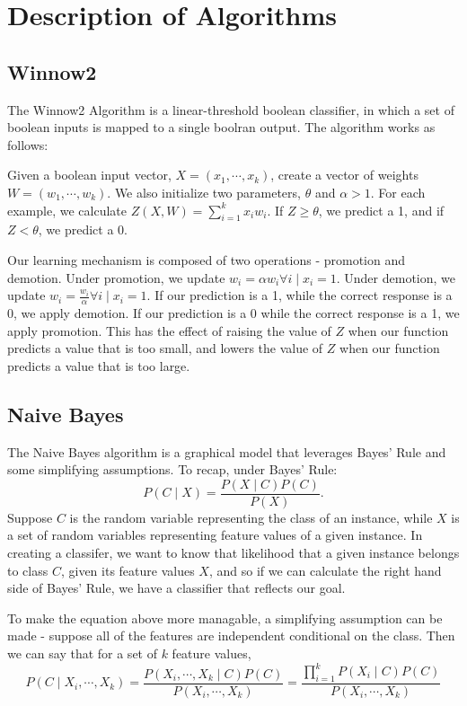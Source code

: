 \documentclass{amsart}
\begin{document}
    \section{Description of Algorithms}
    \subsection*{Winnow2}
    The Winnow2 Algorithm\cite{winnow2} is a linear-threshold boolean classifier, in which a set of boolean inputs is mapped
    to a single boolran output. The algorithm works as follows:

    Given a boolean input vector, $X = (x_1, \cdots, x_k)$,  create a vector of weights $W = (w_1, \cdots, w_k)$.
    We also initialize two parameters, $\theta$ and $\alpha > 1$.
    For each example, we calculate $Z(X, W) = \sum_{i=1}^k x_i w_i$. If $Z \geq \theta$, we
    predict a 1, and if $Z < \theta$, we predict a 0.

    Our learning mechanism is composed of two operations - promotion and demotion.
    Under promotion, we update $w_i = \alpha w_i \forall i \mid x_i = 1$. Under demotion,
    we update $w_i =  \frac{w_i}{\alpha} \forall i \mid x_i = 1$. If our prediction is a 1, while
    the correct response is a 0, we apply demotion. If our prediction is a 0 while the correct
    response is a 1, we apply promotion. This has the effect of raising the value of $Z$ when our
    function predicts a value that is too small, and lowers the value of $Z$ when our
    function predicts a value that is too large.


    \subsection*{Naive Bayes}
    The Naive Bayes algorithm\cite{naivebayes} is a graphical model that leverages Bayes' Rule and some simplifying
    assumptions. To recap, under Bayes' Rule:
    \[
        P(C \mid X) = \frac{P(X \mid C) P(C)}{P(X)}.
    \]
    Suppose $C $ is the random variable representing the class of an instance, while $X$ is a
    set of random variables representing feature values of a given instance. In creating a classifer,
    we want to know that likelihood that a given instance belongs to class $C$, given its feature values $X$,
    and so if we can calculate the right hand side of Bayes' Rule, we have a classifier that reflects our goal.

    To make the equation above more managable, a simplifying assumption can be made - suppose all
    of the features are independent conditional on the class. Then we can say that for a set
    of $k$ feature values,
    \[
        P(C \mid X_i, \cdots, X_k ) = \frac{
            P(X_i, \cdots, X_k\mid C) P(C)
        }{P(X_i, \cdots, X_k)}
        = \frac{
            \prod_{i=1}^k P(X_i \mid C) P(C)
        }{P(X_i, \cdots, X_k)}
    \]
\end{document}
